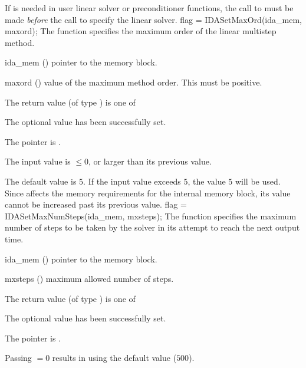 {{  {\warn}If  is needed in user linear solver or preconditioner
  functions, the call to  must be made {\it before} the call
  to specify the linear solver.
}
{
flag = IDASetMaxOrd(ida\_mem, maxord);
}
{
  The function  specifies the maximum order of the
  linear multistep method.
}
{
  \begin{args}
  \item[ida\_mem] ()
    pointer to the {\ida} memory block.
  \item[maxord] ()
    value of the maximum method order.  This must be positive.
  \end{args}
}
{
  The return value  (of type ) is one of
  \begin{args}
  \item[\Id{IDA\_SUCCESS}]
    The optional value has been successfully set.
  \item[\Id{IDA\_MEM\_NULL}]
    The  pointer is .
  \item[\Id{IDA\_ILL\_INPUT}]
    The input value  is $\leq 0$, or larger than
    its previous value.
  \end{args}
}
{
  The default value is $5$.  If the input value exceeds $5$,
  the value $5$ will be used.   Since  affects the memory
  requirements for the internal {\ida} memory block, its value cannot
  be increased past its previous value.
}
{
flag = IDASetMaxNumSteps(ida\_mem, mxsteps);
}
{
  The function  specifies the maximum number
  of steps to be taken by the solver in its attempt to reach
  the next output time.
}
{
  \begin{args}
  \item[ida\_mem] ()
    pointer to the {\ida} memory block.
  \item[mxsteps] ()
    maximum allowed number of steps.
  \end{args}
}
{
  The return value  (of type ) is one of
  \begin{args}
  \item[\Id{IDA\_SUCCESS}]
    The optional value has been successfully set.
  \item[\Id{IDA\_MEM\_NULL}]
    The  pointer is .
  \end{args}
}
{
  Passing  $= 0$ results in {\ida} using the default value ($500$).

}}
